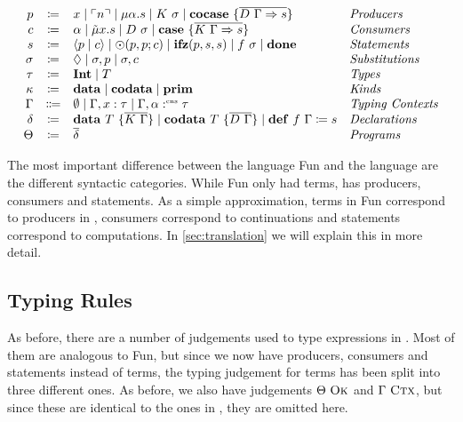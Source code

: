 \begin{definition}
  \[
    \begin{array}{rcll}
      p & \coloneqq & x \mid \lit{n} \mid \mu\alpha.s \mid K\ \sigma \mid \cocase{\overline{D\ \Gamma \Rightarrow s}} & \emph{Producers}\\
      c & \coloneqq & \alpha \mid \tilde{\mu}x.s \mid D\ \sigma \mid \case{\overline{K\ \Gamma \Rightarrow s}}& \emph{Consumers}\\
      s & \coloneqq & \cut{p}{c} \mid \odot(p, p; c) \mid \ifz{p}{s}{s} \mid f\ \sigma\mid \done & \emph{Statements}\\
      \sigma & \coloneqq & \nil \mid \sigma, p \mid \sigma, c & \emph{Substitutions}\\
      \tau & \coloneqq & \tyint \mid T & \emph{Types}\\
      \kappa & \coloneqq & \mathbf{data}\mid\mathbf{codata}\mid\mathbf{prim} & \emph{Kinds}\\
      \Gamma & \Coloneqq & \emptyset \mid \Gamma, x : \tau \mid \Gamma, \alpha \cnt \tau & \emph{Typing Contexts} \\
      \delta & \coloneqq & \mathbf{data}\ T\ \{ \overline{K\ \Gamma} \} \mid \mathbf{codata}\ T\ \{ \overline{D\ \Gamma }\} \mid \defi{f\ \Gamma}{s} & \emph{Declarations}\\
      \Theta & \coloneqq & \overline{\delta} & \emph{Programs}\\
    \end{array}
  \]
\end{definition}
The most important difference between the language Fun and the language \targetlang{} are the different syntactic categories.
While Fun only had terms, \targetlang{} has producers, consumers and statements. 
As a simple approximation, terms in Fun correspond to producers in \targetlang{}, consumers correspond to continuations and statements correspond to computations. 
In \cref{sec:translation} we will explain this in more detail.

\subsection{Typing Rules}
\label{subsec:core:typing-rules}

As before, there are a number of judgements used to type expressions in \targetlang{}. 
Most of them are analogous to Fun, but since we now have producers, consumers and statements instead of terms, the typing judgement for terms has been split into three different ones. 
As before, we also have judgements $\Theta\ \textsc{Ok}$ and $\Gamma\ \textsc{Ctx}$, but since these are identical to the ones in \surfacelang{}, they are omitted here.

